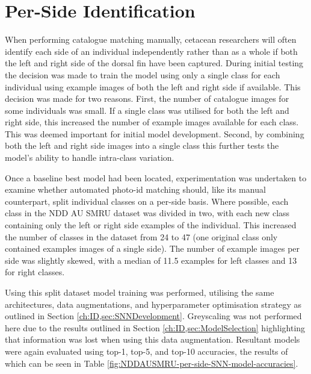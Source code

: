 \section{Per-Side Identification}\label{ch:ID,sec:perSide}

When performing catalogue matching manually, cetacean researchers will often identify each side of an individual independently rather than as a whole if both the left and right side of the dorsal fin have been captured. During initial testing the decision was made to train the model using only a single class for each individual using example images of both the left and right side if available. This decision was made for two reasons. First, the number of catalogue images for some individuals was small. If a single class was utilised for both the left and right side, this increased the number of example images available for each class. This was deemed important for initial model development. Second, by combining both the left and right side images into a single class this further tests the model's ability to handle intra-class variation. 

Once a baseline best model had been located, experimentation was undertaken to examine whether automated photo-id matching should, like its manual counterpart, split individual classes on a per-side basis. Where possible, each class in the NDD AU SMRU dataset was divided in two, with each new class containing only the left or right side examples of the individual. This increased the number of classes in the dataset from 24 to 47 (one original class only contained examples images of a single side). The number of example images per side was slightly skewed, with a median of 11.5 examples for left classes and 13 for right classes.

Using this split dataset model training was performed, utilising the same architectures, data augmentations, and hyperparameter optimisation strategy as outlined in Section \ref{ch:ID,sec:SNNDevelopment}. Greyscaling was not performed here due to the results outlined in Section \ref{ch:ID,sec:ModelSelection} highlighting that information was lost when using this data augmentation. Resultant models were again evaluated using top-1, top-5, and top-10 accuracies, the results of which can be seen in Table \ref{fig:NDDAUSMRU-per-side-SNN-model-accuracies}.

